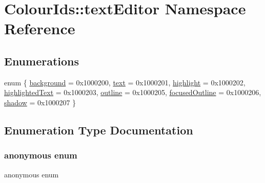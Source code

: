 \hypertarget{namespaceColourIds_1_1textEditor}{}\section{Colour\+Ids\+:\+:text\+Editor Namespace Reference}
\label{namespaceColourIds_1_1textEditor}
\subsection*{Enumerations}
\begin{DoxyCompactItemize}
\item 
enum \{ \newline
\mbox{\hyperlink{namespaceColourIds_1_1textEditor_aee8887ececa0a94265f5b114b7460700a1b96da85b04a0b8e3740f90c68be6eb9}{background}} = 0x1000200, 
\mbox{\hyperlink{namespaceColourIds_1_1textEditor_aee8887ececa0a94265f5b114b7460700a9aef2e0e5f1f3659f99861139154f634}{text}} = 0x1000201, 
\mbox{\hyperlink{namespaceColourIds_1_1textEditor_aee8887ececa0a94265f5b114b7460700a468a49f6ea51d0ecdb63467165ff2923}{highlight}} = 0x1000202, 
\mbox{\hyperlink{namespaceColourIds_1_1textEditor_aee8887ececa0a94265f5b114b7460700a6361d4fcd6d4a5f4e0f0bbf0417a4311}{highlighted\+Text}} = 0x1000203, 
\newline
\mbox{\hyperlink{namespaceColourIds_1_1textEditor_aee8887ececa0a94265f5b114b7460700ad5a9a983688ad1acec5bbd1b5eb0dea9}{outline}} = 0x1000205, 
\mbox{\hyperlink{namespaceColourIds_1_1textEditor_aee8887ececa0a94265f5b114b7460700aa5d8cc5e861d747070bd0edf4cb7ce89}{focused\+Outline}} = 0x1000206, 
\mbox{\hyperlink{namespaceColourIds_1_1textEditor_aee8887ececa0a94265f5b114b7460700a0046ded56b8bea2650af2825c3482eca}{shadow}} = 0x1000207
 \}
\end{DoxyCompactItemize}


\subsection{Enumeration Type Documentation}
\mbox{\label{namespaceColourIds_1_1textEditor_aee8887ececa0a94265f5b114b7460700}} 
\subsubsection{\texorpdfstring{anonymous enum}{anonymous enum}}
{\footnotesize\ttfamily anonymous enum}

